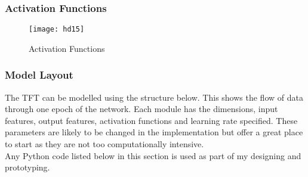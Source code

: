 \documentclass{article}
\begin{document}
\subsubsection{Activation Functions}
\begin{figure}[H]
    \centering
    \texttt{[image: hd15]}
    \caption{Activation Functions}
\end{figure}






\clearpage
\subsubsection{Model Layout}

The TFT can be modelled using the structure below. This shows the flow of data through one epoch of the network.  Each module has the dimensions, input features, output features, activation functions and learning rate specified.
These parameters are likely to be changed in the implementation but offer a great place to start as they are not too computationally intensive.
\\
Any Python code listed below in this section is used as part of my designing and prototyping.
\end{document}
